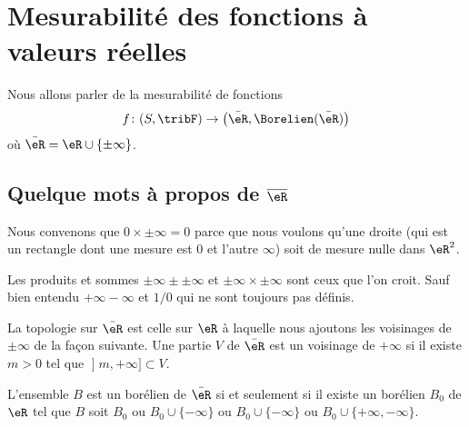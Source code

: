 \section{Mesurabilité des fonctions à valeurs réelles}

Nous allons parler de la mesurabilité de fonctions
\begin{equation}
    f\colon (S,\tribF)\to \big( \bar \eR,\Borelien(\bar \eR) \big)
\end{equation}
où \( \bar \eR=\eR\cup\{ \pm\infty \}\).

\subsection{Quelque mots à propos de $\overline{ \eR }$}        %

\begin{normaltext}      \label{normooGAAJooUPCbzG}
Nous convenons que \( 0\times\pm\infty=0\) parce que nous voulons qu'une droite (qui est un rectangle dont une mesure est \( 0\) et l'autre \( \infty\)) soit de mesure nulle dans \( \eR^2\).

Les produits et sommes \( \pm\infty\pm\pm\infty\) et \( \pm\infty\times \pm\infty\) sont ceux que l'on croit. Sauf bien entendu \( +\infty-\infty\) et \( 1/0\) qui ne sont toujours pas définis.
\end{normaltext}

\begin{definition}
La topologie sur \(\bar \eR\) est celle sur \( \eR\) à laquelle nous ajoutons les voisinages de \( \pm\infty\) de la façon suivante. Une partie \( V\) de \( \bar \eR\) est un voisinage de \( +\infty\) si il existe \( m>0\) tel que \( \mathopen] m , +\infty \mathclose]\subset V\).
\end{definition}

\begin{lemma}       \label{LEMooBLOLooAdNViv}
    L'ensemble \( B\) est un borélien de \( \bar \eR\) si et seulement si il existe un borélien \( B_0\) de \( \eR\) tel que \( B\) soit \( B_0\) ou \( B_0\cup\{ -\infty \}\) ou \( B_0\cup\{ -\infty \}\) ou \( B_0\cup\{ +\infty,-\infty \}\).
\end{lemma}

